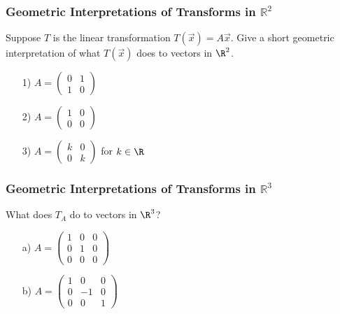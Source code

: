 \begin{frame}
\frametitle{Geometric Interpretations of Transforms in $\mathbb R^2$}

Suppose $T$ is the linear transformation $T(\vec x) = A\vec x$. Give a short geometric interpretation of what  $T(\vec x)$ does to vectors in $\R^2$. 

\begin{enumerate}
    \item[1)] $A=\begin{pmatrix} 0 & 1 \\ 1 & 0 \end{pmatrix}$ \vspace{1cm}

    \item[2)] $A=\begin{pmatrix} 1 & 0 \\ 0 & 0 \end{pmatrix}$ \vspace{1cm}

    \item[3)] $A=\begin{pmatrix} k & 0 \\ 0 & k \end{pmatrix}$ for $k \in \R$ \vspace{1cm}
    
\end{enumerate}

\end{frame}



\begin{frame}
\frametitle{Geometric Interpretations of Transforms in $\mathbb R^3$}

What does $T_A$ do to vectors in $\R^3$?

\begin{enumerate}
    \item[a)] $A=\begin{pmatrix} 1&0&0 \\ 0&1&0 \\ 0&0&0 \end{pmatrix}$ \vspace{2cm}

    \item[b)] $A=\begin{pmatrix} 1&0&0\\0&-1&0\\0&0&1 \end{pmatrix}$ \vspace{1cm}

\end{enumerate}


\end{frame}







